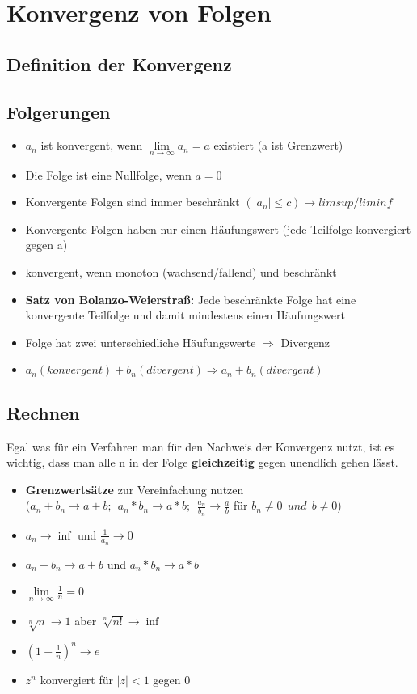 \documentclass[a4paper,12pt]{article} %
\begin{document}
\section{Konvergenz von Folgen}
\subsection{Definition der Konvergenz}
\begin{center}
\end{center}
\subsection{Folgerungen}
\begin{itemize}
\item $a_n$ ist konvergent, wenn $\lim\limits_{n \rightarrow \infty}{a_n} = a$ existiert (a ist Grenzwert)
\item Die Folge ist eine Nullfolge, wenn $a = 0$
\item Konvergente Folgen sind immer beschränkt $(|a_n| \leq c) \rightarrow limsup/liminf$
\item Konvergente Folgen haben nur einen Häufungswert (jede Teilfolge konvergiert gegen a)
\item konvergent, wenn monoton (wachsend/fallend) und beschränkt
\item \textbf{Satz von Bolanzo-Weierstraß:} Jede beschränkte Folge hat eine konvergente Teilfolge und damit mindestens einen Häufungswert
\item Folge hat zwei unterschiedliche Häufungswerte $\Rightarrow$ Divergenz
\item $a_n (konvergent) + b_n (divergent) \Rightarrow a_n + b_n (divergent)$
\end{itemize}
\subsection{Rechnen}
Egal was für ein Verfahren man für den Nachweis der Konvergenz nutzt, ist es wichtig, dass man alle n in der Folge \textbf{gleichzeitig} gegen unendlich gehen lässt.
\begin{itemize}
\item \textbf{Grenzwertsätze} zur Vereinfachung nutzen \\
($a_n+b_n \rightarrow a+b; \ \ a_n*b_n \rightarrow a*b; \ \ \frac{a_n}{b_n} \rightarrow \frac{a}{b}$ für $b_n \neq 0 \ \ und \ \ b \neq 0$)
\item $a_n \rightarrow \inf$ und $\frac{1}{a_n} \rightarrow 0$
\item $a_n + b_n \rightarrow a+b$ und $a_n * b_n \rightarrow a*b$
\item $\lim\limits_{n \rightarrow \infty}{\frac{1}{n}=0}$
\item $\sqrt[n]{n}\rightarrow 1$ aber $\sqrt[n]{n!}\rightarrow \inf$
\item $(1+\frac{1}{n})^n\rightarrow e$
\item $z^n$ konvergiert für $|z| < 1$ gegen 0 
\end{itemize}
\newpage
\end{document}

